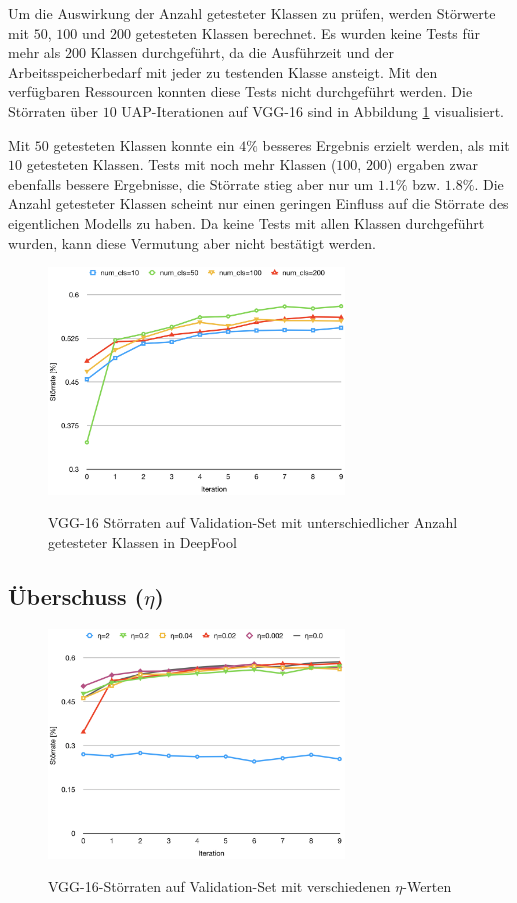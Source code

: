\documentclass{FFHS_Thesis_Additions/ffhsthesis}
\begin{document}
Um die Auswirkung der Anzahl getesteter Klassen zu prüfen, werden Störwerte mit $50$, $100$ und $200$ getesteten Klassen berechnet. 
Es wurden keine Tests für mehr als $200$ Klassen durchgeführt, da die Ausführzeit und der Arbeitsspeicherbedarf mit jeder zu testenden Klasse ansteigt. 
Mit den verfügbaren Ressourcen konnten diese Tests nicht durchgeführt werden. 
Die Störraten über $10$ UAP-Iterationen auf VGG-16 sind in Abbildung \ref{fig_einfluss_num_cls} visualisiert.

Mit $50$ getesteten Klassen konnte ein $4\%$ besseres Ergebnis erzielt werden, als mit $10$ getesteten Klassen. 
Tests mit noch mehr Klassen ($100$, $200$) ergaben zwar ebenfalls bessere Ergebnisse, die Störrate stieg aber nur um $1.1\%$ bzw. $1.8\%$. 
Die Anzahl getesteter Klassen scheint nur einen geringen Einfluss auf die Störrate des eigentlichen Modells zu haben. 
Da keine Tests mit allen Klassen durchgeführt wurden, kann diese Vermutung aber nicht bestätigt werden.

\begin{figure}[h]
\caption{VGG-16 Störraten auf Validation-Set mit unterschiedlicher Anzahl getesteter Klassen in DeepFool}
\centering
\includegraphics[width=0.7\textwidth]{./images/einfluss_num_cls.png}
\label{fig_einfluss_num_cls}
\end{figure}



\subsection{Überschuss ($\eta$)}

\begin{figure}[h]
\caption{VGG-16-Störraten auf Validation-Set mit verschiedenen $\eta$-Werten}
\centering
\includegraphics[width=0.7\textwidth]{./images/einfluss_eta.png}
\label{fig_einfluss_eta}
\end{figure}
\end{document}
